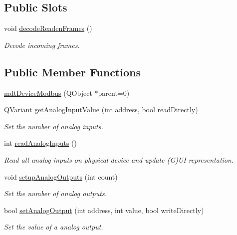\subsection*{Public Slots}
\begin{DoxyCompactItemize}
\item 
void \hyperlink{classmdt_device_modbus_ad2a43c428667654e71b288d0c44eca03}{decodeReadenFrames} ()
\begin{DoxyCompactList}\small\item\em Decode incoming frames. \end{DoxyCompactList}\end{DoxyCompactItemize}
\subsection*{Public Member Functions}
\begin{DoxyCompactItemize}
\item 
\hyperlink{classmdt_device_modbus_ac69cfbe26681342ba05672ab63de2a1f}{mdtDeviceModbus} (QObject $\ast$parent=0)
\item 
QVariant \hyperlink{classmdt_device_modbus_acf9a158bc7d9847858217e44394af07e}{getAnalogInputValue} (int address, bool readDirectly)
\begin{DoxyCompactList}\small\item\em Set the number of analog inputs. \end{DoxyCompactList}\item 
int \hyperlink{classmdt_device_modbus_a4bf4c1d87f6b61955a015234a928e864}{readAnalogInputs} ()
\begin{DoxyCompactList}\small\item\em Read all analog inputs on physical device and update (G)UI representation. \end{DoxyCompactList}\item 
void \hyperlink{classmdt_device_modbus_a233f0167ca1b728f9d47ebc4f597e2d1}{setupAnalogOutputs} (int count)
\begin{DoxyCompactList}\small\item\em Set the number of analog outputs. \end{DoxyCompactList}\item 
bool \hyperlink{classmdt_device_modbus_a5a8f605ef4c14907cef354daac90b180}{setAnalogOutput} (int address, int value, bool writeDirectly)
\begin{DoxyCompactList}\small\item\em Set the value of a analog output. \end{DoxyCompactList}\item 

\end{DoxyCompactItemize}

